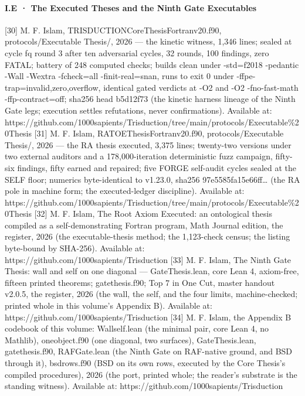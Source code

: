 \documentclass[10pt]{article}
\renewcommand{\_}{\origunderscore\allowbreak}
\begin{document}
\hypertarget{i.e-the-executed-theses-and-the-ninth-gate-executables}{%
\paragraph{I.E · The Executed Theses and the Ninth Gate
Executables}\label{i.e-the-executed-theses-and-the-ninth-gate-executables}}

{[}30{]} M. F. Islam, TRISDUCTION\_Core\_Thesis\_Fortran\_v2\_4\_0.f90,
protocols/Executable Thesis/, 2026 --- the kinetic witness, 1,346 lines;
sealed at cycle fq round 3 after ten adversarial cycles, 32 rounds, 100
findings, zero FATAL; battery of 248 computed checks; builds clean under
-std=f2018 -pedantic -Wall -Wextra -fcheck=all -finit-real=snan, runs to
exit 0 under -ffpe-trap=invalid,zero,overflow, identical gated verdicts
at -O2 and -O2 -fno-fast-math -ffp-contract=off; sha256 head b5d12f73
(the kinetic harness lineage of the Ninth Gate legs; execution settles
refutations, never confirmations). Available at:
https://github.com/1000sapients/Trisduction/tree/main/protocols/Executable\%20Thesis
{[}31{]} M. F. Islam, RA\_TOE\_Thesis\_Fortran\_v2\_0\_0.f90,
protocols/Executable Thesis/, 2026 --- the RA thesis executed, 3,375
lines; twenty-two versions under two external auditors and a
178,000-iteration deterministic fuzz campaign, fifty-six findings, fifty
earned and repaired; five FORGE self-audit cycles sealed at the SELF
floor; numerics byte-identical to v1.23.0, sha256
97e5585fa15e66ff\ldots{} (the RA pole in machine form; the
executed-ledger discipline). Available at:
https://github.com/1000sapients/Trisduction/tree/main/protocols/Executable\%20Thesis
{[}32{]} M. F. Islam, The Root Axiom Executed: an ontological thesis
compiled as a self-demonstrating Fortran program, Math Journal edition,
the register, 2026 (the executable-thesis method; the 1,123-check
census; the listing byte-bound by SHA-256). Available at:
https://github.com/1000sapients/Trisduction {[}33{]} M. F. Islam, The
Ninth Gate Thesis: wall and self on one diagonal --- GateThesis.lean,
core Lean 4, axiom-free, fifteen printed theorems; gate\_thesis.f90; Top
7 in One Cut, master handout v2.0.5, the register, 2026 (the wall, the
self, and the four limits, machine-checked; printed whole in this
volume's Appendix B). Available at:
https://github.com/1000sapients/Trisduction {[}34{]} M. F. Islam, the
Appendix B codebook of this volume: Wallself.lean (the minimal pair,
core Lean 4, no Mathlib), one\_object.f90 (one diagonal, two surfaces),
GateThesis.lean, gate\_thesis.f90, RAFGate.lean (the Ninth Gate on
RAF-native ground, and BSD through it), bsd\_rows.f90 (BSD on its own
rows, executed by the Core Thesis's compiled procedures), 2026 (the
port, printed whole; the reader's substrate is the standing witness).
Available at: https://github.com/1000sapients/Trisduction
\end{document}
